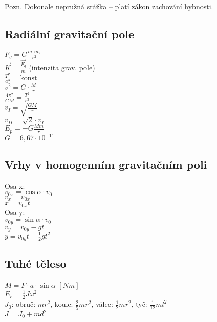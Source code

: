 \documentclass{article}
\begin{document}
\noindent Pozn. Dokonale nepružná srážka -- platí zákon zachování hybnosti.
\vspace{3pt}

\subsection*{Radiální gravitační pole}
\begin{multicols}{3}
\noindent $F_g=G\frac{m_1m_2}{r^2}$\\
$\vec{K}=\frac{\vec{F_g}}{m}$ (intenzita grav. pole)\\
$\frac{T^2}{a^3} = \text{konst}$\\
$v^2=G\cdot \frac{M}{r}$\\
$\frac{4\pi ^2}{GM}=\frac{T^2}{r^3}$\\
$v_I = \sqrt{\frac{GM}{r}}$\\
$v_{II} = \sqrt{2}\cdot v_I$\\
$E_p = -G\frac{Mm}{r}$\\
$G=6,67\cdot 10^{-11}$\\
\end{multicols}

\subsection*{Vrhy v homogenním gravitačním poli}
\begin{multicols}{2}
\noindent Osa x:\\
$v_{0x}=\cos{\alpha}\cdot v_0$\\
$v_x=v_{0x}$\\
$x=v_{0x}t$\\
Osa y:\\
$v_{0y}=\sin{\alpha}\cdot v_0$\\
$v_y=v_{0y}-gt$\\
$y=v_{0y}t-\frac{1}{2}gt^2$
\end{multicols}

\subsection*{Tuhé těleso}
\begin{multicols}{2}
\noindent $M = F \cdot a \cdot \sin{\alpha}$ $[Nm]$\\
$E_r = \frac{1}{2}J\omega ^2$\\
$J_0$: obruč: $mr^2$, koule: $\frac{2}{5}mr^2$, válec: $\frac{1}{2}mr^2$, tyč: $\frac{1}{12}ml^2$\\
$J=J_0+md^2$
\end{multicols}
\end{document}
